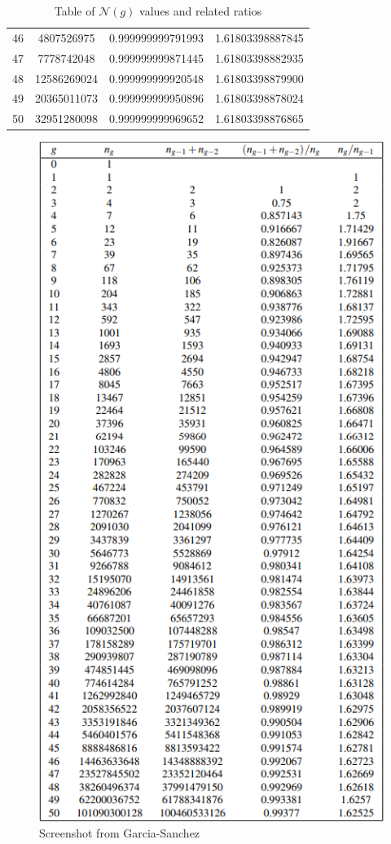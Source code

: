 \begin{table}[!h]
\begin{tabular}{|c|c|c|c|}
46 & 4807526975 & 0.999999999791993 & 1.61803398887845 \\
47 & 7778742048 & 0.999999999871445 & 1.61803398882935 \\
48 & 12586269024 & 0.999999999920548 & 1.61803398879900 \\
49 & 20365011073 & 0.999999999950896 & 1.61803398878024 \\
50 & 32951280098 & 0.999999999969652 & 1.61803398876865 \\
\hline
\end{tabular}
\caption{Table of $\mathcal{N}(g)$ values and related ratios}
\end{table}


\begin{figure}[!h]
    \centering
    \includegraphics{Erik/Napkin/image.png}
    \caption{Screenshot from Garcia-Sanchez}
    \label{fig:enter-label}
\end{figure}
